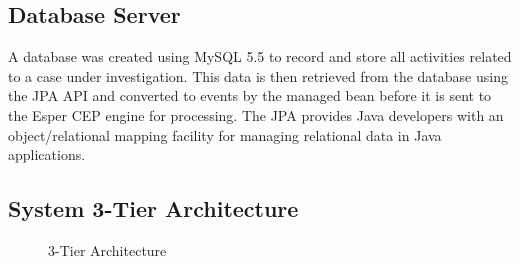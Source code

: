 \subsection{Database Server}

\noindent A database was created using MySQL 5.5 to record and store all activities related to a case under investigation. This data is then retrieved from the database using the JPA API and converted to events by the managed bean before it is sent to the Esper CEP engine for processing. The JPA provides Java developers with an object/relational mapping facility for managing relational data in Java applications.

\subsection{System 3-Tier Architecture}

\begin{center}
\begin{figure}[h]
\caption{3-Tier Architecture}

\end{figure}
\end{center}
